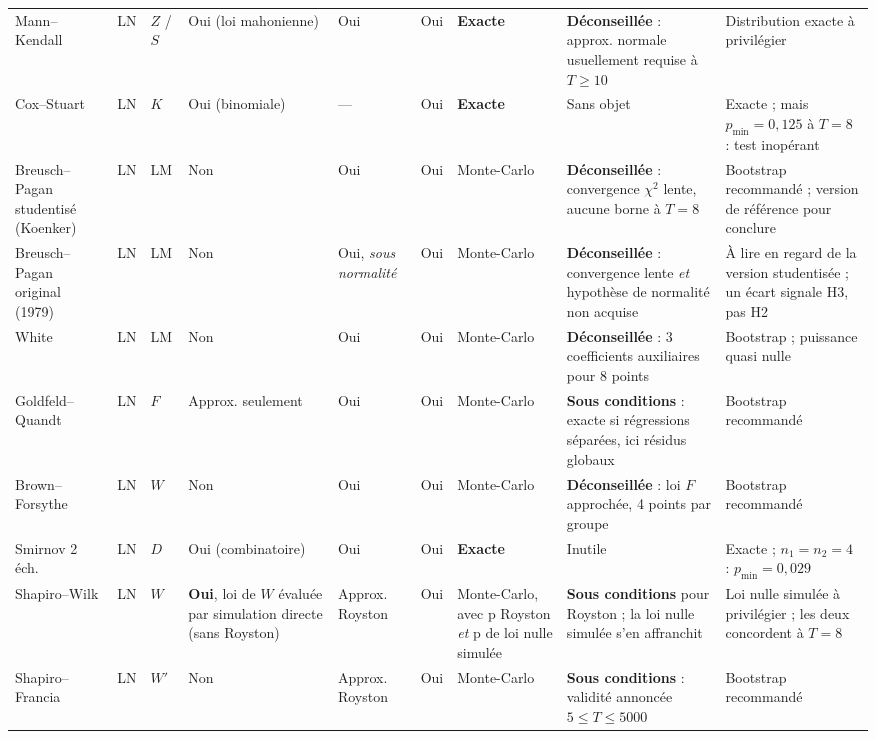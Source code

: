 \documentclass[a4paper,11pt]{article}
\begin{document}
\begin{landscape}
\begin{center}
\begin{longtable}{@{}p{2.9cm}p{1.5cm}p{1.1cm}p{1.3cm}p{1.3cm}p{1.3cm}p{2.7cm}p{4.7cm}p{4.1cm}@{}}
Mann--Kendall & LN & $Z$ / $S$ & Oui (loi mahonienne) & Oui & Oui & \textbf{Exacte} &
\textbf{Déconseillée} : approx. normale usuellement requise à $T\ge 10$ &
Distribution exacte à privilégier \\

Cox--Stuart & LN & $K$ & Oui (binomiale) & --- & Oui & \textbf{Exacte} &
Sans objet & Exacte ; mais $p_{\min}=0{,}125$ à $T=8$ : test inopérant \\

Breusch--Pagan studentisé (Koenker) & LN & LM & Non & Oui & Oui & Monte-Carlo &
\textbf{Déconseillée} : convergence $\chi^2$ lente, aucune borne à $T=8$ &
Bootstrap recommandé ; version de référence pour conclure \\

Breusch--Pagan original (1979) & LN & LM & Non & Oui, \emph{sous normalité} & Oui & Monte-Carlo &
\textbf{Déconseillée} : convergence lente \emph{et} hypothèse de normalité non acquise &
À lire en regard de la version studentisée ; un écart signale H3, pas H2 \\

White & LN & LM & Non & Oui & Oui & Monte-Carlo &
\textbf{Déconseillée} : 3 coefficients auxiliaires pour 8 points &
Bootstrap ; puissance quasi nulle \\

Goldfeld--Quandt & LN & $F$ & Approx. seulement & Oui & Oui & Monte-Carlo &
\textbf{Sous conditions} : exacte si régressions séparées, ici résidus globaux &
Bootstrap recommandé \\

Brown--Forsythe & LN & $W$ & Non & Oui & Oui & Monte-Carlo &
\textbf{Déconseillée} : loi $F$ approchée, 4 points par groupe &
Bootstrap recommandé \\

Smirnov 2 éch. & LN & $D$ & Oui (combinatoire) & Oui & Oui & \textbf{Exacte} &
Inutile & Exacte ; $n_1=n_2=4$ : $p_{\min}=0{,}029$ \\

Shapiro--Wilk & LN & $W$ & \textbf{Oui}, loi de $W$ évaluée par simulation directe (sans Royston)
& Approx. Royston & Oui & Monte-Carlo, avec p Royston \emph{et} p de loi nulle simulée &
\textbf{Sous conditions} pour Royston ; la loi nulle simulée s'en affranchit &
Loi nulle simulée à privilégier ; les deux concordent à $T=8$ \\

Shapiro--Francia & LN & $W'$ & Non & Approx. Royston & Oui & Monte-Carlo &
\textbf{Sous conditions} : validité annoncée $5\le T\le 5000$ &
Bootstrap recommandé \\


\end{longtable}
\end{center}
\end{landscape}
\end{document}
